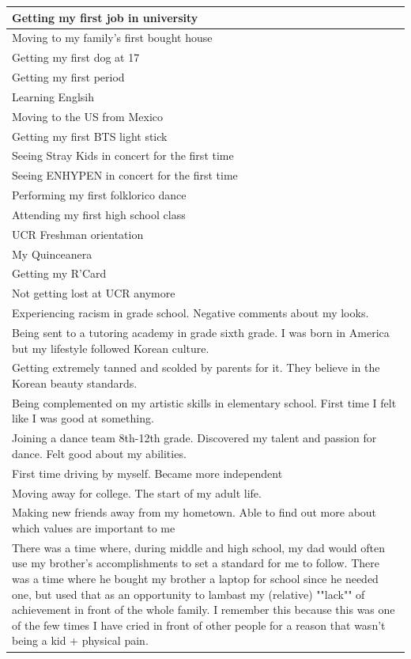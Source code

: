 \documentclass[
  .7em,
  letterpaper,
  DIV=11,
  numbers=noendperiod]{scrartcl}
\begin{document}
\begin{table}
\begin{tabular}{l}
\hline
Getting my first job in university\\
\hline
Moving to my family's first bought house\\
\hline
Getting my first dog at 17\\
\hline
Getting my first period\\
\hline
Learning Englsih\\
\hline
Moving to the US from Mexico\\
\hline
Getting my first BTS light stick\\
\hline
Seeing Stray Kids in concert for the first time\\
\hline
Seeing ENHYPEN in concert for the first time\\
\hline
Performing my first folklorico dance\\
\hline
Attending my first high school class\\
\hline
UCR Freshman orientation\\
\hline
My Quinceanera\\
\hline
Getting my R'Card\\
\hline
Not getting lost at UCR anymore\\
\hline
Experiencing racism in grade school. Negative comments about my looks.\\
\hline
Being sent to a tutoring academy in grade sixth grade. I was born in America but my lifestyle followed Korean culture.\\
\hline
Getting extremely tanned and scolded by parents for it. They believe in the Korean beauty standards.\\
\hline
Being complemented on my artistic skills in elementary school. First time I felt like I was good at something.\\
\hline
Joining a dance team 8th-12th grade. Discovered my talent and passion for dance. Felt good about my abilities.\\
\hline
First time driving by myself. Became more independent\\
\hline
Moving away for college. The start of my adult life.\\
\hline
Making new friends away from my hometown. Able to find out more about which values are important to me\\
\hline
There was a time where, during middle and high school, my dad would often use my brother's accomplishments to set a standard for me to follow. There was a time where he bought my brother a laptop for school since he needed one, but used that as an opportunity to lambast my (relative) ""lack"" of achievement in front of the whole family. I remember this because this was one of the few times I have cried in front of other people for a reason that wasn't being a kid + physical pain.\\

\end{tabular}
\end{table}
\end{document}
